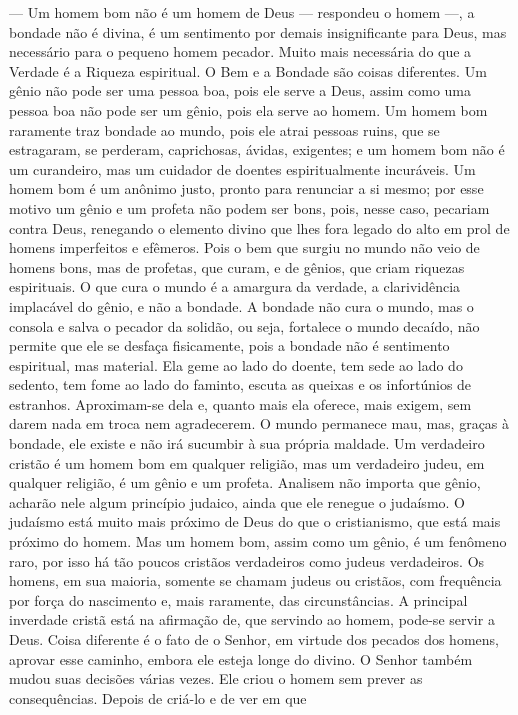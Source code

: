 --- Um homem bom não é um homem de Deus --- respondeu o homem ---, a
bondade não é divina, é um sentimento por demais insignificante para
Deus, mas necessário para o pequeno homem pecador. Muito mais necessária
do que a Verdade é a Riqueza espiritual. O Bem e a Bondade são coisas
diferentes. Um gênio não pode ser uma pessoa boa, pois ele serve a Deus,
assim como uma pessoa boa não pode ser um gênio, pois ela serve ao
homem. Um homem bom raramente traz bondade ao mundo, pois ele atrai
pessoas ruins, que se estragaram, se perderam, caprichosas, ávidas,
exigentes; e um homem bom não é um curandeiro, mas um cuidador de
doentes espiritualmente incuráveis. Um homem bom é um anônimo justo,
pronto para renunciar a si mesmo; por esse motivo um gênio e um profeta
não podem ser bons, pois, nesse caso, pecariam contra Deus, renegando o
elemento divino que lhes fora legado do alto em prol de homens
imperfeitos e efêmeros. Pois o bem que surgiu no mundo não veio de
homens bons, mas de profetas, que curam, e de gênios, que criam riquezas
espirituais. O que cura o mundo é a amargura da verdade, a clarividência
implacável do gênio, e não a bondade. A bondade não cura o mundo, mas o
consola e salva o pecador da solidão, ou seja, fortalece o mundo
decaído, não permite que ele se desfaça fisicamente, pois a bondade não
é sentimento espiritual, mas material. Ela geme ao lado do doente, tem
sede ao lado do sedento, tem fome ao lado do faminto, escuta as queixas
e os infortúnios de estranhos. Aproximam-se dela e, quanto mais ela
oferece, mais exigem, sem darem nada em troca nem agradecerem. O mundo
permanece mau, mas, graças à bondade, ele existe e não irá sucumbir à
sua própria maldade. Um verdadeiro cristão é um homem bom em qualquer
religião, mas um verdadeiro judeu, em qualquer religião, é um gênio e um
profeta. Analisem não importa que gênio, acharão nele algum princípio
judaico, ainda que ele renegue o judaísmo. O judaísmo está muito mais
próximo de Deus do que o cristianismo, que está mais próximo do homem.
Mas um homem bom, assim como um gênio, é um fenômeno raro, por isso há
tão poucos cristãos verdadeiros como judeus verdadeiros. Os homens, em
sua maioria, somente se chamam judeus ou cristãos, com frequência por
força do nascimento e, mais raramente, das circunstâncias. A principal
inverdade cristã está na afirmação de, que servindo ao homem, pode-se
servir a Deus. Coisa diferente é o fato de o Senhor, em virtude dos
pecados dos homens, aprovar esse caminho, embora ele esteja longe do
divino. O Senhor também mudou suas decisões várias vezes. Ele criou o
homem sem prever as consequências. Depois de criá-lo e de ver em que
